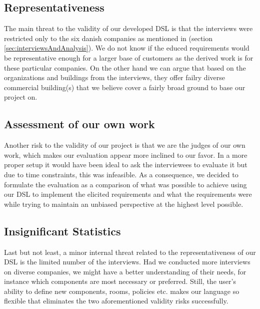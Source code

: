 \subsection{Representativeness}
The main threat to the validity of our developed DSL is that the interviews were restricted only to the six danish companies as mentioned in  (section \ref{sec:interviewsAndAnalysis}). We do not know if the educed requirements would be representative enough for a larger base of customers as the derived work is for these particular companies. On the other hand we can argue that based on the organizations and buildings from the interviews, they offer failry diverse commercial building(s) that we believe cover a fairly broad ground to base our project on.

\subsection{Assessment of our own work}
Another risk to the validity of our project is that we are the judges of our own work, which makes our evaluation appear more inclined to our favor. In a more proper setup it would have been ideal to ask the interviewees to evaluate it but due to time constraints, this was infeasible. As a consequence, we decided to formulate the evaluation as a comparison of what was possible to achieve using our DSL to implement the elicited requirements and what the requirements were while trying to maintain an unbiased perspective at the highest level possible. 

\subsection{Insignificant Statistics}

Last but not least, a minor internal threat related to the representativeness of our DSL is the limited number of the interviews. Had we conducted more interviews on diverse companies, we might have a better understanding of their needs, for instance which components are most necessary or preferred. Still, the user's ability to define new components, rooms, policies etc. makes our language so flexible that eliminates the two aforementioned validity risks successfully.